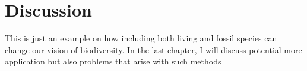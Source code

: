 \section{Discussion} %
This is just an example on how including both living and fossil species can change our vision of biodiversity.
In the last chapter, I will discuss potential more application but also problems that arise with such methods

